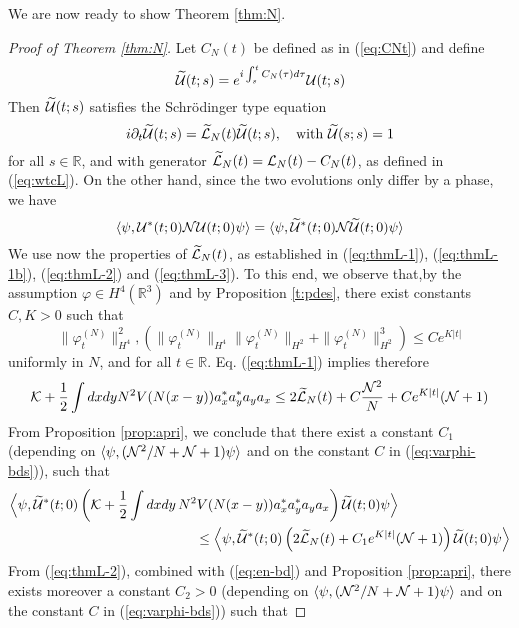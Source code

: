 \documentclass[11pt,a4paper,DIV11]{scrartcl}	%
\newcommand{\cU}{{\cal U}}
\newcommand{\bR}{{\mathbb R}}
\newcommand{\wt}{\widetilde}
\newcommand{\cK}{{\cal K}}
\newcommand{\cL}{{\cal L}}
\newcommand{\cN}{{\cal N}}
\begin{document}
We are now ready to show Theorem \ref{thm:N}.

\begin{proof}[Proof of Theorem \ref{thm:N}]
Let $C_N (t)$ be defined as in (\ref{eq:CNt}) and define
\[ \wt{\cU} (t;s) = e^{i \int_s^t C_N (\tau) d\tau} \cU (t;s) \]
Then $\wt{\cU} (t;s)$ satisfies the Schr\"odinger type equation
\[ i\partial_t \wt{\cU} (t;s) = \wt{\cL}_N (t) \wt{\cU} (t;s), \quad \text{with } \wt{\cU} (s;s) = 1 \]
for all $s \in \bR$, and with generator $\wt{\cL}_N (t) = \cL_N (t) - C_N (t)$, as defined in (\ref{eq:wtcL}). On the other hand, since the two evolutions only differ by a phase, we have
\[ \langle \psi , \cU^* (t;0) \cN \cU (t;0) \psi \rangle = \langle \psi , \wt{\cU}^* (t;0) \cN \wt{\cU} (t;0) \psi \rangle \]
We use now the properties of $\wt{\cL}_N(t)$, as established in (\ref{eq:thmL-1}), (\ref{eq:thmL-1b}), (\ref{eq:thmL-2}) and (\ref{eq:thmL-3}). To this end, we observe that,by the assumption $\varphi \in H^4 (\bR^3)$ and by Proposition \ref{t:pdes}, there exist constants $C,K > 0$ such that \begin{equation}\label{eq:varphi-bds}  \| \varphi_t^{(N)} \|_{H^4}^2 , \left(\| \varphi_t^{(N)} \|_{H^4} \| \varphi_t^{(N)} \|_{H^2} + \| \varphi_t^{(N)} \|_{H^2}^3 \right) \leq C e^{K |t|} \end{equation}
uniformly in $N$, and for all $t \in \bR$. Eq. (\ref{eq:thmL-1}) implies therefore 
\begin{equation}\label{eq:en-bd} \cK + \frac{1}{2} \int dx dy N^2 V(N (x-y)) a_x^* a_y^* a_y a_x \leq 2 \wt{\cL}_N (t) + C \frac{\cN^2}{N} + C e^{K |t|} (\cN + 1) \end{equation}
{F}rom Proposition \ref{prop:apri}, we conclude that there exist a constant $C_1$ (depending on $\langle \psi , (\cN^2/ N + \cN + 1) \psi \rangle$ and on the constant $C$ in (\ref{eq:varphi-bds})), such that
\begin{equation}\label{eq:grw-1} \begin{split} 
\Big\langle \psi , \wt{\cU}^* (t;0) &\left(\cK + \frac{1}{2} \int dx dy \, N^2 V (N (x-y)) a_x^* a_y^* a_y a_x \right) \wt{\cU} (t;0) \psi \Big\rangle \\ &\hspace{3cm} \leq \left\langle \psi , \wt{\cU}^* (t;0) \left( 2 \wt{\cL}_N (t) + C_1 e^{K|t|} (\cN + 1) \right) \wt{\cU} (t;0) \psi \right\rangle \end{split} \end{equation}
{F}rom (\ref{eq:thmL-2}), combined with (\ref{eq:en-bd}) and Proposition \ref{prop:apri}, there exists moreover a constant $C_2 > 0$ (depending on $\langle \psi , (\cN^2/ N + \cN + 1) \psi \rangle$ and on the constant $C$ in (\ref{eq:varphi-bds})) such that

\end{proof}
\end{document}
